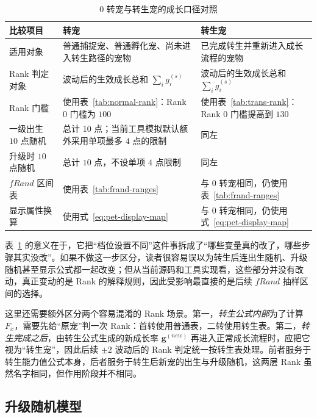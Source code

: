 \begin{table}[H]
    \centering
    \caption{0 转宠与转生宠的成长口径对照}
    \label{tab:normal-vs-trans-growth}
    \begin{tabularx}{\textwidth}{>{\raggedright\arraybackslash}p{3.6cm} >{\raggedright\arraybackslash}X >{\raggedright\arraybackslash}X}
        \toprule
        比较项目 & 0 转宠 & 转生宠 \\
        \midrule
        适用对象 & 普通捕捉宠、普通孵化宠、尚未进入转生路径的宠物 & 已完成转生并重新进入成长流程的宠物 \\
        Rank 判定对象 & 波动后的生效成长总和 $\sum_i g_i^{(s)}$ & 波动后的生效成长总和 $\sum_i g_i^{(s)}$ \\
        Rank 门槛 & 使用表~\ref{tab:normal-rank}：Rank 0 门槛为 $100$ & 使用表~\ref{tab:trans-rank}：Rank 0 门槛提高到 $130$ \\
        一级出生 $10$ 点随机 & 总计 $10$ 点；当前工具模拟默认额外采用单项最多 $4$ 点的限制 & 同左 \\
        升级时 $10$ 点随机 & 总计 $10$ 点，不设单项 $4$ 点限制 & 同左 \\
        $fRand$ 区间表 & 使用表~\ref{tab:frand-ranges} & 与 0 转宠相同，仍使用表~\ref{tab:frand-ranges} \\
        显示属性换算 & 使用式~\eqref{eq:pet-display-map} & 与 0 转宠相同，仍使用式~\eqref{eq:pet-display-map} \\
        \bottomrule
    \end{tabularx}
\end{table}

表~\ref{tab:normal-vs-trans-growth} 的意义在于，它把“档位设置不同”这件事拆成了“哪些变量真的改了，哪些步骤其实没改”。如果不做这一步区分，读者很容易误以为转生后连出生随机、升级随机甚至显示公式都一起改变；但从当前源码和工具实现看，这些部分并没有改动，真正变动的是 Rank 的解释规则，因此受影响最直接的是后续 $fRand$ 抽样区间的选择。

这里还需要额外区分两个容易混淆的 Rank 场景。第一，\emph{转生公式内部}为了计算 $F_x$，需要先给“原宠”判一次 Rank：首转使用普通表，二转使用转生表。第二，\emph{转生完成之后}，由转生公式生成的新成长率 $\bm{g}^{(new)}$ 再进入正常成长流程时，应把它视为“转生宠”，因此后续 $\pm2$ 波动后的 Rank 判定统一按转生表处理。前者服务于转生能力值公式本身，后者服务于转生后新宠的出生与升级随机，这两层 Rank 虽然名字相同，但作用阶段并不相同。

\subsection{升级随机模型}


